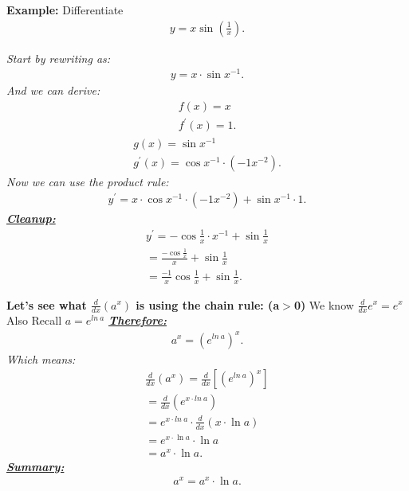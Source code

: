 \documentclass{report}
\begin{document}
  \bigbreak \noindent 
  \begin{mdframed}
    \textbf{Example:} Differentiate
    \begin{align*}
      y = x\sin{(\frac{1}{x})}
    .\end{align*}
  \end{mdframed}
  \bigbreak \noindent 
  \textit{Start by rewriting as:}
  \begin{align*}
    y = x \cdot \sin{x^{-1}}
  .\end{align*}
  \bigbreak \noindent 
  \textit{And we can derive:}
  \begin{align*}
    f(x) = x \\
    f^{\prime}(x) = 1
  .\end{align*}
  \begin{align*}
    g(x) = \sin{x^{-1}} \\
    g^{\prime}(x) = \cos{x^{-1}} \cdot (-1x^{-2})
  .\end{align*}
  \bigbreak \noindent 
  \textit{Now we can use the product rule:}
  \begin{align*}
    y^{\prime} = x \cdot \cos{x^{-1}} \cdot (-1x^{-2}) + \sin{x^{-1}} \cdot 1
  .\end{align*}
  \bigbreak \noindent 
  \textbf{\textit{\underline{Cleanup:}}}
  \begin{align*}
    y^{\prime} = -\cos{\frac{1}{x}} \cdot x^{-1} + \sin{\frac{1}{x}} \\
    = \frac{-\cos{\frac{1}{x}}}{x} + \sin{\frac{1}{x}} \\ 
    = \frac{-1}{x}\cos{\frac{1}{x}} + \sin{\frac{1}{x}}
  .\end{align*}

  \pagebreak \bigbreak \noindent
  \begin{mdframed}
    \textbf{Let's see what $\frac{d}{dx}(a^{x})$ is using the chain rule: (a$>$0)}
    \bigbreak \noindent 
    We know $\frac{d}{dx}e^{x} =e^{x}$
     \bigbreak \noindent 
     Also Recall $a = e^{ln\ a}$ 
     \bigbreak \noindent 
     \textbf{\textit{\underline{Therefore:}}}
     \begin{align*}
       a^{x} = (e^{ln\ a})^{x}
     .\end{align*}
     \bigbreak \noindent 
     \textit{Which means:}
     \begin{align*}
       \frac{d}{dx}(a^{x}) = \frac{d}{dx}[(e^{ln\ a})^{x}] \\
       = \frac{d}{dx}(e^{x \cdot ln\ a}) \\
       = e^{x\cdot ln\ a} \cdot \frac{d}{dx}(x\cdot \ln{a}) \\
       = e^{x\cdot \ln{a}} \cdot \ln{a}  \\
       = a^{x} \cdot \ln{a}
    .\end{align*}
    \bigbreak \noindent 
    \textbf{\textit{\underline{Summary:}}}
    \begin{align*}
      a^{x} = a^{x} \cdot \ln{a} 
    .\end{align*}
  \end{mdframed}
\end{document}
